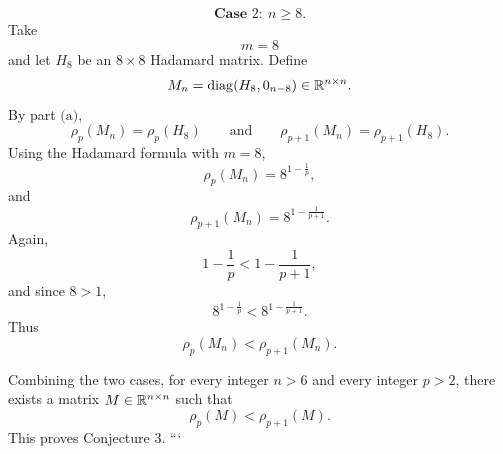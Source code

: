 \[
\textbf{Case }2:\ n\geq 8.
\]
Take
\[
m=8
\]
and let \(H_8\) be an \(8\times 8\) Hadamard matrix. Define
\[
M_n=\operatorname{diag}(H_8,0_{n-8})\in \mathbb{R}^{n\times n}.
\]
By part \(\text{(a)}\),
\[
\rho_p(M_n)=\rho_p(H_8)
\qquad\text{and}\qquad
\rho_{p+1}(M_n)=\rho_{p+1}(H_8).
\]
Using the Hadamard formula with \(m=8\),
\[
\rho_p(M_n)=8^{1-\frac1p},
\]
and
\[
\rho_{p+1}(M_n)=8^{1-\frac1{p+1}}.
\]
Again,
\[
1-\frac1p<1-\frac1{p+1},
\]
and since \(8>1\),
\[
8^{1-\frac1p}<8^{1-\frac1{p+1}}.
\]
Thus
\[
\boxed{\rho_p(M_n)<\rho_{p+1}(M_n)}.
\]

Combining the two cases, for every integer \(n>6\) and every integer \(p>2\), there exists a matrix \(M\in \mathbb{R}^{n\times n}\) such that
\[
\rho_p(M)<\rho_{p+1}(M).
\]
This proves Conjecture \(3\).
```